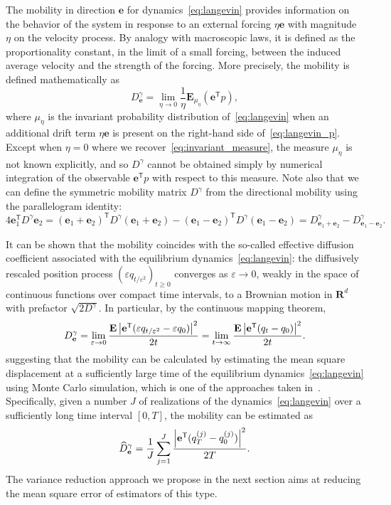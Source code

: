 \documentclass[11pt,a4paper]{article}
\newcommand{\expect}[0]{\mathbf{E}}
\newcommand{\real}{\mathbf R}
\newcommand{\vect}[1]{\boldsymbol{\mathbf #1}}
\renewcommand{\t}{\mathsf T}
\theoremstyle{plain}
\numberwithin{equation}{section}
\renewcommand{\geq}{\geqslant}
\begin{document}
The mobility in direction $\vect e$ for dynamics~\eqref{eq:langevin} provides information on the behavior of the system
in response to an external forcing $\eta \vect e$ with magnitude~$\eta$ on the velocity process.
By analogy with macroscopic laws,
it is defined as the proportionality constant,
in the limit of a small forcing,
between the induced average velocity and the strength  of the forcing.
More precisely,
the mobility is defined mathematically as
\[
    D^{\gamma}_{\vect e} = \lim_{\eta \to 0} \frac{1}{\eta}\expect_{\mu_{\eta}} (\vect e^\t p),
\]
where $\mu_{\eta}$ is the invariant probability distribution of~\eqref{eq:langevin} when
an additional drift term $\eta \vect e$ is present on the right-hand side of~\eqref{eq:langevin_p}.
Except when $\eta = 0$ where we recover~\eqref{eq:invariant_measure},
the measure $\mu_{\eta}$ is not known explicitly,
and so $D^{\gamma}$ cannot be obtained simply by numerical integration of the observable $\vect e^\t p$ with respect to this measure.
Note also that we can define the symmetric mobility matrix $D^{\gamma}$ from the directional mobility
using the parallelogram identity:
\[
    4 \vect e_1^\t D^{\gamma} \vect e_2
    = (\vect e_1 + \vect e_2) ^\t D^{\gamma} (\vect e_1 + \vect e_2)
    - (\vect e_1 - \vect e_2) ^\t D^{\gamma} (\vect e_1 - \vect e_2)
    = D^{\gamma}_{\vect e_1 + \vect e_2} - D^{\gamma}_{\vect e_1 - \vect e_2}.
\]

It can be shown that the mobility coincides with the so-called effective diffusion coefficient associated with the equilibrium dynamics~\eqref{eq:langevin}:
the diffusively rescaled position process $(\varepsilon q_{t/\varepsilon^2})_{t\geq0}$ converges as $\varepsilon \to 0$,
weakly in the space of continuous functions over compact time intervals,
to a Brownian motion in $\real^d$ with prefactor $\sqrt{2 D^{\gamma}}$.
In particular, by the continuous mapping theorem,
\begin{equation}
    \label{eq:einsteins_formula}
    D^{\gamma}_{\vect e}
    =\lim_{\varepsilon \to 0} \frac{\expect\abs{\vect e^\t (\varepsilon q_{t/\varepsilon^2} - \varepsilon q_0)}^2}{2 t}
    =\lim_{t \to \infty} \frac{\expect \abs{\vect e^\t (q_t - q_0)}^2}{2t}.
\end{equation}
suggesting that the mobility can be calculated by
estimating the mean square displacement at a sufficiently large time of the equilibrium dynamics~\eqref{eq:langevin}
using Monte Carlo simulation,
which is one of the approaches taken in~\cite{MR2427108}.
Specifically, given a number $J$ of realizations of the dynamics~\eqref{eq:langevin} over a sufficiently long time interval $[0, T]$,
the mobility can be estimated as
\begin{equation}
    \label{eq:naive_estimator}
    \widehat D^{\gamma}_{\vect e}
    = \frac{1}{J} \sum_{j=1}^{J} \frac{\abs{\vect e^\t (q^{(j)}_T - q^{(j)}_0)}^2}{2T}.
\end{equation}
The variance reduction approach we propose in the next section aims at reducing the mean square error of estimators of this type.
\end{document}

